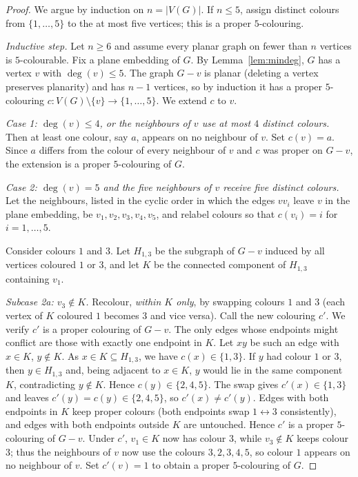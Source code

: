 \documentclass{amsart}
\theoremstyle{remark}
\begin{document}
\begin{proof}
We argue by induction on $n=|V(G)|$. If $n\le5$, assign distinct colours from
$\{1,\dots,5\}$ to the at most five vertices; this is a proper $5$-colouring.

\emph{Inductive step.} Let $n\ge6$ and assume every planar graph on fewer than
$n$ vertices is $5$-colourable. Fix a plane embedding of $G$. By
Lemma~\ref{lem:mindeg}, $G$ has a vertex $v$ with $\deg(v)\le5$. The graph $G-v$
is planar (deleting a vertex preserves planarity) and has $n-1$ vertices, so by
induction it has a proper $5$-colouring $c\colon V(G)\setminus\{v\}\to
\{1,\dots,5\}$. We extend $c$ to $v$.

\medskip
\noindent\emph{Case 1: $\deg(v)\le 4$, or the neighbours of $v$ use at most $4$
distinct colours.} Then at least one colour, say $a$, appears on no neighbour of
$v$. Set $c(v)=a$. Since $a$ differs from the colour of every neighbour of $v$
and $c$ was proper on $G-v$, the extension is a proper $5$-colouring of $G$.

\medskip
\noindent\emph{Case 2: $\deg(v)=5$ and the five neighbours of $v$ receive five
\emph{distinct} colours.} Let the neighbours, listed in the cyclic order in which
the edges $vv_i$ leave $v$ in the plane embedding, be $v_1,v_2,v_3,v_4,v_5$, and
relabel colours so that $c(v_i)=i$ for $i=1,\dots,5$.

Consider colours $1$ and $3$. Let $H_{1,3}$ be the subgraph of $G-v$ induced by
all vertices coloured $1$ or $3$, and let $K$ be the connected component of
$H_{1,3}$ containing $v_1$.

\emph{Subcase 2a: $v_3\notin K$.} Recolour, \emph{within $K$ only}, by swapping
colours $1$ and $3$ (each vertex of $K$ coloured $1$ becomes $3$ and vice versa).
Call the new colouring $c'$. We verify $c'$ is a proper colouring of $G-v$. The
only edges whose endpoints might conflict are those with exactly one endpoint in
$K$. Let $xy$ be such an edge with $x\in K$, $y\notin K$. As $x\in K\subseteq
H_{1,3}$, we have $c(x)\in\{1,3\}$. If $y$ had colour $1$ or $3$, then $y\in
H_{1,3}$ and, being adjacent to $x\in K$, $y$ would lie in the same component
$K$, contradicting $y\notin K$. Hence $c(y)\in\{2,4,5\}$. The swap gives
$c'(x)\in\{1,3\}$ and leaves $c'(y)=c(y)\in\{2,4,5\}$, so $c'(x)\ne c'(y)$. Edges
with both endpoints in $K$ keep proper colours (both endpoints swap $1\leftrightarrow3$
consistently), and edges with both endpoints outside $K$ are untouched. Hence
$c'$ is a proper $5$-colouring of $G-v$. Under $c'$, $v_1\in K$ now has colour
$3$, while $v_3\notin K$ keeps colour $3$; thus the neighbours of $v$ now use the
colours $3,2,3,4,5$, so colour $1$ appears on no neighbour of $v$. Set $c'(v)=1$
to obtain a proper $5$-colouring of $G$.


\end{proof}
\end{document}
